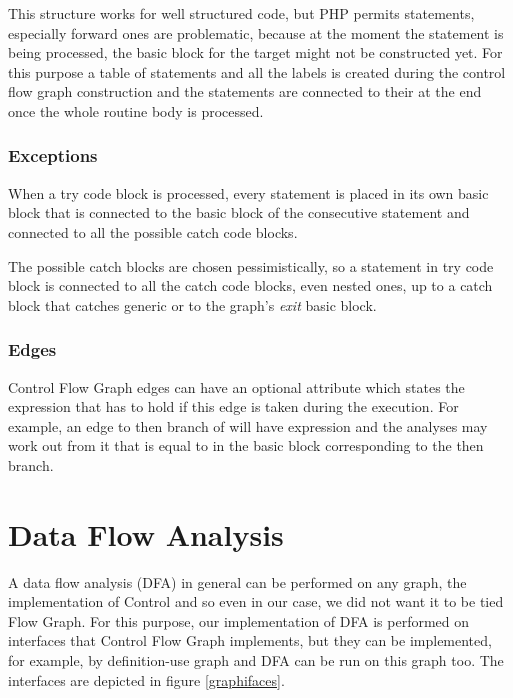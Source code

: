         This structure works for well structured code, but PHP permits 
         statements, especially forward ones are problematic, 
        because at the moment the  statement is being processed, 
        the basic block for the target might not be constructed yet. 
        For this purpose a table of  statements and all the labels 
        is created during the control flow graph construction and the 
         statements are connected to their  at the 
        end once the whole routine body is processed.
        
        \subsubsection*{Exceptions}
        When a try code block is processed, every statement is placed in 
        its own basic block that is connected to the basic block of the 
        consecutive statement and connected to all the possible catch code blocks.
        
        The possible catch blocks are chosen pessimistically, so 
        a statement in try code block is connected to all the catch code blocks, 
        even nested ones, up to a catch block that catches generic  
        or to the graph's \emph{exit} basic block.
        
        \subsubsection*{Edges}
        Control Flow Graph edges can have an optional attribute which 
        states the expression that has to hold if this edge is taken 
        during the execution. For example, an edge to then branch of 
         will have expression  and the 
        analyses may work out from it that  is equal to 
         in the basic block corresponding to the then branch.
        
    \section{Data Flow Analysis}
        A data flow analysis (DFA) in general can be performed on any graph, 
        the implementation of Control 
        and so even in our case, we did not want it to be tied 
        Flow Graph. For this purpose, our implementation of DFA is 
        performed on interfaces that Control Flow Graph implements, 
        but they can be implemented, for example, by definition-use 
        graph\cite{aho1985compilers} and DFA can be run on this graph too.
        The interfaces are depicted in figure \ref{graphifaces}.
        
